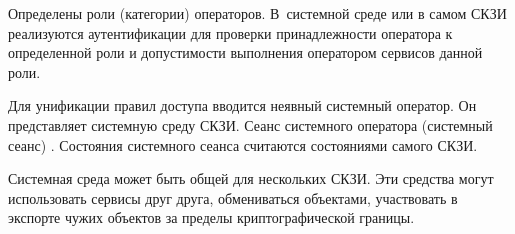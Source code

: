 
Определены роли (категории) операторов.
%
В~системной среде или в самом СКЗИ реализуются  
аутентификации для проверки принадлежности оператора к определенной роли и 
допустимости выполнения оператором сервисов данной роли.


Для унификации правил доступа вводится неявный системный оператор.
Он представляет системную среду СКЗИ. Сеанс системного оператора 
(системный сеанс) .
%
Состояния системного сеанса считаются состояниями самого СКЗИ.


Системная среда может быть общей для нескольких СКЗИ. Эти средства могут 
использовать сервисы друг друга, обмениваться объектами, участвовать в экспорте 
чужих объектов за пределы криптографической границы.

